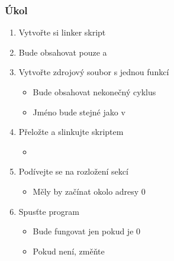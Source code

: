 \begin{frame}
  \frametitle{Úkol}

  \begin{enumerate}
    \item Vytvořte si linker skript
    \item Bude obsahovat pouze  a 
    \item Vytvořte zdrojový soubor s jednou funkcí
    \begin{itemize}
      \item Bude obsahovat nekonečný cyklus
      \item Jméno bude stejné jako v 
    \end{itemize}

    \item Přeložte a slinkujte skriptem
    \begin{itemize}
      \item {}
    \end{itemize}

    \item Podívejte se na rozložení sekcí
    \begin{itemize}
      \item Měly by začínat okolo adresy 0
    \end{itemize}

    \item Spusťte program
    \begin{itemize}
      \item Bude fungovat jen pokud  je 0
      \item Pokud není, změňte
    \end{itemize}
  \end{enumerate}

\end{frame}

